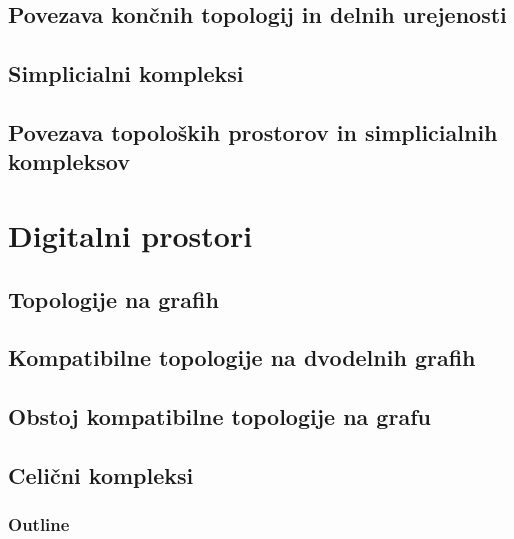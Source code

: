 \documentclass{beamer}
\begin{document}
\subsection{Povezava končnih topologij in delnih urejenosti}
\subsection{Simplicialni kompleksi}
\subsection{Povezava topoloških prostorov in simplicialnih kompleksov}

\section{Digitalni prostori}
\subsection{Topologije na grafih}
\subsection{Kompatibilne topologije na dvodelnih grafih}
\subsection{Obstoj kompatibilne topologije na grafu}
\subsection{Celični kompleksi}

\begin{frame}
\frametitle{Outline}
\end{frame}
\end{document}
